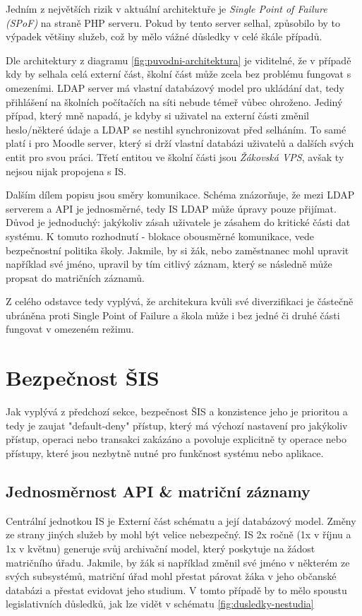 \documentclass[FM,Proj]{tulthesis}
\begin{document}
Jedním z největších rizik v aktuální architektuře je \textit{Single Point of Failure (SPoF)} na straně PHP serveru. 
Pokud by tento server selhal, způsobilo by to výpadek většiny služeb, což by mělo vážné důsledky v celé škále případů. 

Dle architektury z diagramu \ref{fig:puvodni-architektura} je viditelné, že v případě kdy by selhala celá externí část,
školní část může zcela bez problému fungovat s omezeními. LDAP server má vlastní databázový model pro ukládání dat, tedy
přihlášení na školních počítačích na síti nebude témeř vůbec ohroženo. Jediný případ, který mně napadá, je kdyby si uživatel
na externí části změnil heslo/některé údaje a LDAP se nestihl synchronizovat před selháním. To samé platí i pro Moodle
server, který si drží vlastní databázi uživatelů a dalších svých entit pro svou práci.
Třetí entitou ve školní části jsou \textit{Žákovská VPS}, avšak ty nejsou nijak propojena s IS.

Dalším dílem popisu jsou směry komunikace. Schéma znázorňuje, že mezi LDAP serverem a API je jednosměrné, tedy IS
LDAP může úpravy pouze přijímat. Důvod je jednoduchý: jakýkoliv zásah uživatele je zásahem do kritické části 
dat systému. K tomuto rozhodnutí - blokace obousměrné komunikace, vede bezpečnostní politika školy. Jakmile,
by si žák, nebo zaměstnanec mohl upravit například své jméno, upravil by tím citlivý záznam, který se následně
může propsat do matričních záznamů.

Z celého odstavce tedy vyplývá, že architekura kvůli své diverzifikaci je částečně ubráněna proti Single Point of Failure
a škola může i bez jedné či druhé části fungovat v omezeném režimu.

\section{Bezpečnost ŠIS}
\label{section:bezpecnost-sis}
Jak vyplývá z předchozí sekce, bezpečnost ŠIS a konzistence jeho je prioritou a tedy je
zaujat "default-deny" přístup, který má výchozí nastavení pro jakýkoliv přístup, operaci
nebo transakci zakázáno a povoluje explicitně ty operace nebo přístupy, které jsou
nezbytně nutné pro funkčnost systému nebo aplikace.

\subsection*{Jednosměrnost API \& matriční záznamy}  
\label{section:jednosmernost-api-a-matricni-zaznamy}
Centrální jednotkou IS je Externí část schématu a její databázový model. Změny ze strany jiných služeb by mohl
být velice nebezpečný. IS 2x ročně (1x v říjnu a 1x v květnu) generuje svůj archivační model, který poskytuje
na žádost matričního úřadu.
Jakmile, by žák si například změnil své jméno v některém ze svých subsystémů, matriční úřad mohl přestat
párovat žáka v jeho občanské databázi a přestat evidovat jeho studium. V tomto případě by to mělo spoustu 
legislativních důsledků, jak lze vidět v schématu \ref{fig:dusledky-nestudia}
\end{document}
